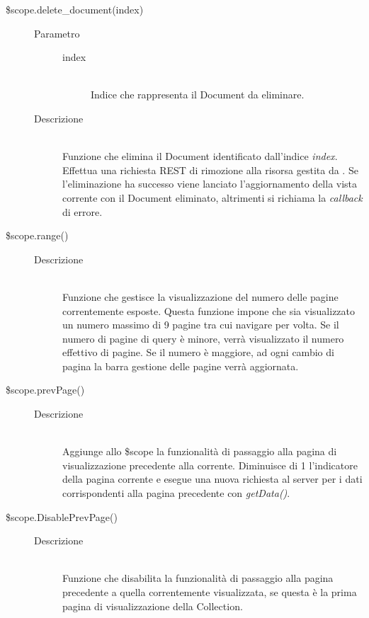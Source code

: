 \begin{description}
\begin{description}
 \item[\$scope.delete\_document(index)] \hfill
  \begin{description}
  	\item[Parametro] \hfill
  		\begin{description}
  			\item[index] \hfill \\
  			Indice che rappresenta il Document da eliminare.
       \end{description}
  	\item[Descrizione] \hfill \\
     Funzione che elimina il Document identificato dall'indice \textit{index}. Effettua una richiesta REST di rimozione alla risorsa gestita da .
  Se l'eliminazione ha successo viene lanciato l'aggiornamento della vista corrente con il Document eliminato, altrimenti si richiama la \textit{callback} di errore.
    \end{description}
    
  \item[\$scope.range()] \hfill
  \begin{description}
  	\item[Descrizione] \hfill \\
  	Funzione che gestisce la visualizzazione del numero delle pagine correntemente esposte. Questa funzione impone che sia visualizzato un numero massimo di 9 pagine tra cui navigare per volta. Se il numero di pagine di query è minore, verrà visualizzato il numero effettivo di pagine. Se il numero è maggiore, ad ogni cambio di pagina la barra gestione delle pagine verrà aggiornata.
  \end{description}
  
  \item[\$scope.prevPage()] \hfill
  \begin{description}
  	\item[Descrizione] \hfill \\  
  Aggiunge allo \$scope la funzionalità di passaggio alla pagina di visualizzazione precedente alla corrente.
  Diminuisce di 1 l'indicatore della pagina corrente e esegue una nuova richiesta al server per i dati corrispondenti alla pagina precedente con \textit{getData()}.
    \end{description}

  \item[\$scope.DisablePrevPage()] \hfill
  \begin{description}
  	\item[Descrizione] \hfill \\
  	Funzione che disabilita la funzionalità di passaggio alla pagina precedente a quella correntemente visualizzata, se questa è la prima pagina di visualizzazione della Collection.
  \end{description}
  

\end{description}
\end{description}
